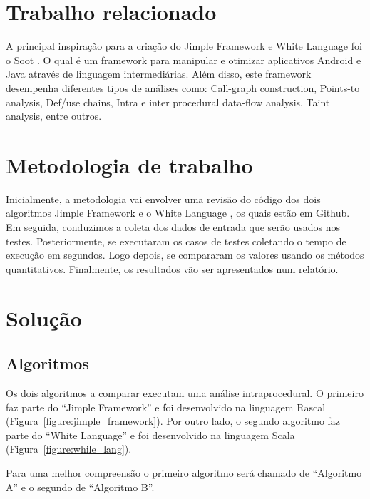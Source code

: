 \documentclass[12pt]{article}
\begin{document}
\section{Trabalho relacionado}

A principal inspiração para a criação do Jimple Framework\cite{jimple_web} e  White Language \cite{while_lang_web} foi o Soot \cite{soot_web}. O qual é um framework para manipular e otimizar aplicativos Android e Java através de linguagem intermediárias. Além disso, este framework desempenha diferentes tipos de análises como: Call-graph construction, Points-to analysis, Def/use chains,  Intra e inter procedural data-flow analysis, Taint analysis, entre outros.


\section{Metodologia de trabalho}

Inicialmente, a metodologia vai envolver uma revisão do código dos dois algoritmos Jimple Framework \cite{jimple_web} e o White Language \cite{while_lang_web}, os quais estão em Github. Em seguida, conduzimos a coleta dos dados de entrada que serão usados nos testes. Posteriormente, se executaram os casos de testes coletando o tempo de execução em segundos. Logo depois, se compararam os valores usando os métodos quantitativos. Finalmente, os resultados vão ser apresentados num relatório.

\section{Solução}


\subsection{Algoritmos}

Os dois algoritmos a comparar executam uma análise intraprocedural. O primeiro faz parte do ``Jimple Framework'' \cite{jimple_web} e foi desenvolvido na linguagem Rascal (Figura~\ref{figure:jimple_framework}). Por outro lado, o segundo algoritmo faz parte do ``White Language'' \cite{while_lang_web} e foi desenvolvido na linguagem Scala (Figura~\ref{figure:while_lang}). 

Para uma melhor compreensão o primeiro algoritmo será chamado de ``Algoritmo A'' e o segundo de ``Algoritmo B''.
\end{document}
